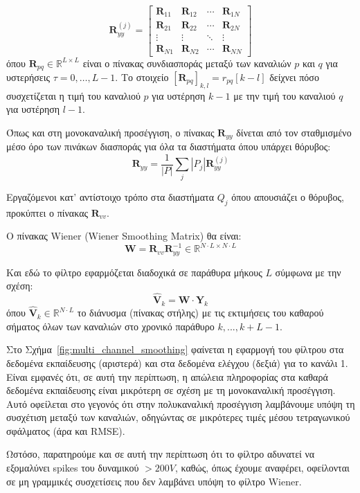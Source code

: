 \documentclass[12pt]{article} %
\begin{document}
\[
\mathbf{R}_{yy}^{(j)} =
\begin{bmatrix}
    \mathbf{R}_{11} & \mathbf{R}_{12} & \cdots & \mathbf{R}_{1N} \\
    \mathbf{R}_{21} & \mathbf{R}_{22} & \cdots & \mathbf{R}_{2N} \\
    \vdots & \vdots & \ddots & \vdots \\
    \mathbf{R}_{N1} & \mathbf{R}_{N2} & \cdots & \mathbf{R}_{NN}
\end{bmatrix}
\]
όπου $\mathbf{R}_{pq} \in \mathbb{R}^{L \times L}$ είναι ο πίνακας συνδιασποράς μεταξύ των καναλιών $p$ και 
$q$ για υστερήσεις $\tau = 0, \ldots, L - 1$. Το στοιχείο $[\mathbf{R}_{pq}]_{k, l} = r_{pq}[k - l]$ δείχνει
πόσο συσχετίζεται η τιμή του καναλιού $p$ για υστέρηση $k - 1$ με την τιμή του καναλιού $q$ για υστέρηση 
$l - 1$.

Όπως και στη μονοκαναλική προσέγγιση, ο πίνακας $\mathbf{R}_{yy}$ δίνεται από τον σταθμισμένο μέσο όρο  
των πινάκων διασποράς για όλα τα διαστήματα όπου υπάρχει θόρυβος:
\[
\mathbf{R}_{yy} = \frac{1}{|P|} \sum_j |P_j| \mathbf{R}_{yy}^{(j)}
\]

Εργαζόμενοι κατ' αντίστοιχο τρόπο στα διαστήματα $Q_j$ όπου απουσιάζει ο θόρυβος, προκύπτει ο πίνακας 
$\mathbf{R}_{vv}$.

Ο πίνακας Wiener (Wiener Smoothing Matrix) θα είναι:
\[
\mathbf{W} = \mathbf{R}_{vv}\mathbf{R}_{yy}^{-1} \in \mathbb{R}^{N \cdot L \times N \cdot L}
\]

Και εδώ το φίλτρο εφαρμόζεται διαδοχικά σε παράθυρα μήκους $L$ σύμφωνα με την σχέση:
\[
\hat{\mathbf{V}}_k = \mathbf{W} \cdot \mathbf{Y}_k
\] 
όπου $\hat{\mathbf{V}}_k \in \mathbb{R}^{N \cdot L}$ το διάνυσμα (πίνακας στήλης) με τις εκτιμήσεις του καθαρού 
σήματος όλων των καναλιών στο χρονικό παράθυρο $k,...,k+L-1$.

Στο Σχήμα~\ref{fig:multi_channel_smoothing} φαίνεται η εφαρμογή του φίλτρου στα δεδομένα εκπαίδευσης 
(αριστερά) και στα δεδομένα ελέγχου (δεξιά) για το κανάλι 1. Είναι εμφανές ότι, σε αυτή την περίπτωση, 
η απώλεια πληροφορίας στα καθαρά δεδομένα εκπαίδευσης είναι μικρότερη σε σχέση με τη μονοκαναλική προσέγγιση.  
Αυτό οφείλεται στο γεγονός ότι στην πολυκαναλική προσέγγιση λαμβάνουμε υπόψη τη συσχέτιση μεταξύ των καναλιών,  
οδηγώντας σε μικρότερες τιμές μέσου τετραγωνικού σφάλματος (άρα και RMSE).

Ωστόσο, παρατηρούμε και σε αυτή την περίπτωση ότι το φίλτρο αδυνατεί να εξομαλύνει 
spikes του δυναμικού $ > 200 V$, καθώς, όπως έχουμε αναφέρει,
οφείλονται σε μη γραμμικές συσχετίσεις που δεν λαμβάνει υπόψη το φίλτρο 
Wiener.
\end{document}
